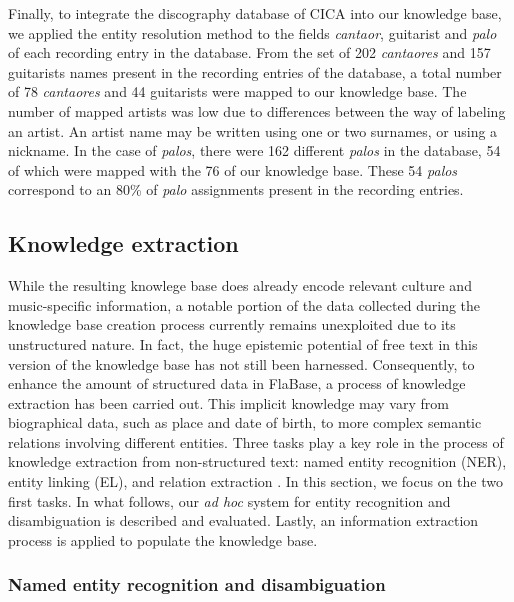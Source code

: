 Finally, to integrate the discography database of CICA into our knowledge base, we applied the entity resolution method to the fields \textit{cantaor}, guitarist and \textit{palo} of each recording entry in the database. From the set of 202 \textit{cantaores} and 157 guitarists names present in the recording entries of the database, a total number of 78 \textit{cantaores} and 44 guitarists were mapped to our knowledge base. The number of mapped artists was low due to differences between the way of labeling an artist. An artist name may be written using one or two surnames, or using a nickname. In the case of \textit{palos}, there were 162 different \textit{palos} in the database, 54 of which were mapped with the 76 of our knowledge base. These 54 \textit{palos} correspond to an 80\% of \textit{palo} assignments present in the recording entries.


\subsection{Knowledge extraction}
\label{sec:musicology:kb_extraction}

While the resulting knowlege base does already encode relevant culture and music-specific information, a notable portion of the data collected during the knowledge base creation process currently remains unexploited due to its unstructured nature. In fact, the huge epistemic potential of free text in this version of the knowledge base has not still been harnessed. Consequently, to enhance the amount of structured data in FlaBase, a process of knowledge extraction has been carried out. This implicit knowledge may vary from biographical data, such as place and date of birth, to more complex semantic relations involving different entities. Three tasks play a key role in the process of knowledge extraction from non-structured text: named entity recognition (NER), entity linking (EL), and relation extraction \citep{Usbeck2014}. In this section, we focus on the two first tasks. In what follows, our \textit{ad hoc} system for entity recognition and disambiguation is described and evaluated. Lastly, an information extraction process is applied to populate the knowledge base.

\subsubsection{Named entity recognition and disambiguation}\label{sec:musicology:entity_linking}

